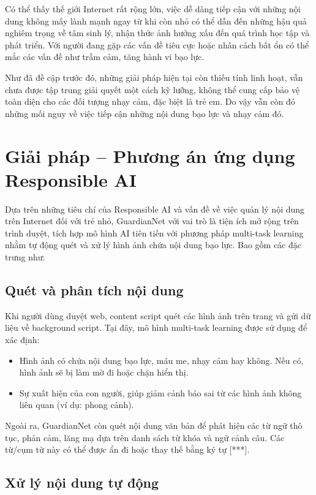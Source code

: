 \documentclass[12pt,a4paper]{article}
\begin{document}
Có thể thấy thế giới Internet rất rộng lớn, việc dễ dàng tiếp cận với những nội dung không mấy lành mạnh ngay từ khi còn nhỏ có thể dẫn đến những hậu quả nghiêm trọng về tâm sinh lý, nhận thức ảnh hưởng xấu đến quá trình học tập và phát triển. Với người đang gặp các vấn đề tiêu cực hoặc nhân cách bất ổn có thể mắc các vấn đề như trầm cảm, tăng hành vi bạo lực.

Như đã đề cập trước đó, những giải pháp hiện tại còn thiếu tính linh hoạt, vẫn chưa được tập trung giải quyết một cách kỹ lưỡng, không thể cung cấp bảo vệ toàn diện cho các đối tượng nhạy cảm, đặc biệt là trẻ em. Do vậy vẫn còn đó những mối nguy về việc tiếp cận những nội dung bạo lực và nhạy cảm đó.

\section{Giải pháp -- Phương án ứng dụng Responsible AI}

Dựa trên những tiêu chí của Responsible AI và vấn đề về việc quản lý nội dung trên Internet đối với trẻ nhỏ, GuardianNet với vai trò là tiện ích mở rộng trên trình duyệt, tích hợp mô hình AI tiên tiến với phương pháp multi-task learning nhằm tự động quét và xử lý hình ảnh chứa nội dung bạo lực. Bao gồm các đặc trưng như:

\subsection{Quét và phân tích nội dung}

Khi người dùng duyệt web, content script quét các hình ảnh trên trang và gửi dữ liệu về background script. Tại đây, mô hình multi-task learning được sử dụng để xác định:

\begin{itemize}
  \item Hình ảnh có chứa nội dung bạo lực, máu me, nhạy cảm hay không. Nếu có, hình ảnh sẽ bị làm mờ đi hoặc chặn hiển thị.
  
  \item Sự xuất hiện của con người, giúp giảm cảnh báo sai từ các hình ảnh không liên quan (ví dụ: phong cảnh).
\end{itemize}

Ngoài ra, GuardianNet còn quét nội dung văn bản để phát hiện các từ ngữ thô tục, phản cảm, lăng mạ dựa trên danh sách từ khóa và ngữ cảnh câu. Các từ/cụm từ này có thể được ẩn đi hoặc thay thế bằng ký tự [***].

\subsection{Xử lý nội dung tự động}
\end{document}
